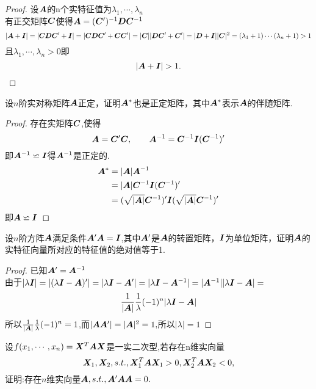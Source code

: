 \documentclass[lang=cn,11pt,normal]{elegantbook}
\begin{document}
	\begin{proof}
		设$\AA$的n个实特征值为$\lambda_1,\cdots,\lambda_n$
		\\有正交矩阵$\CC$使得$\AA=(\CC')^{-1}\DD\CC^{-1}$
		\begin{equation}
		|\AA+\II|=|\CC\DD\CC'+\II|=|\CC\DD\CC'+\CC\CC'|=|\CC||\DD\CC'+\CC'|=|\DD+\II||\CC|^2=(\lambda_1+1)\cdots(\lambda_n+1)>1
		\end{equation}
		且$\lambda_1,\cdots,\lambda_n>0$即
		\begin{equation}
		|\AA+\II|>1.
		\end{equation}
	\end{proof}
	\begin{exercise}
		设$n$阶实对称矩阵$\AA$正定，证明$\AA^*$也是正定矩阵，其中$\AA^*$表示$\AA$的伴随矩阵.
	\end{exercise}
	\begin{proof}
		存在实矩阵$\CC$,使得
		\begin{equation}\AA=\CC'\CC,\qquad\AA^{-1}=\CC^{-1}\II(\CC^{-1})'
		\end{equation}
		即$\AA^{-1}\backsimeq\II$得$\AA^{-1}$是正定的.\\
		\begin{equation}
		\begin{aligned}
		\AA^*&=|\AA|\AA^{-1}\\
		&=|\AA|\CC^{-1}\II(\CC^{-1})'\\
		&=(\sqrt{|\AA|}\CC^{-1})'\II(\sqrt{|\AA|}\CC^{-1})'
		\end{aligned}
		\end{equation}
		即$\AA\backsimeq\II$
	\end{proof}
	\begin{exercise}
		设$n$阶方阵$\AA$满足条件$\AA'\AA=\II$,其中$\AA'$是$\AA$的转置矩阵，$\II$为单位矩阵，证明$\AA$的实特征向量所对应的特征值的绝对值等于1.
	\end{exercise}
	\begin{proof}
		已知$\AA'=\AA^{-1}$\\
		由于$|\lambda\II|=|(\lambda\II-\AA)'|=|\lambda\II-\AA'|=|\lambda\II-\AA^{-1}|=|\AA^{-1}||\lambda\II-\AA|=$
		\begin{equation}
		\frac{1}{|\AA|}\frac{1}{\lambda}(-1)^n|\lambda\II-\AA|
		\end{equation}
		所以$\frac{1}{|\AA|}\frac{1}{\lambda}(-1)^n=1$,而$|\AA\AA'|=|\AA|^2=1,$所以$|\lambda|=1$
	\end{proof}
	\begin{exercise}
		设$f(x_1,\cdots,x_n)=\XX^T\AA\XX$是一实二次型,若存在n维实向量
		\begin{equation}
		\XX_1,\XX_2,s.t.,\XX_1^T\AA\XX_1>0,\XX_2^T\AA\XX_2<0,
		\end{equation}
		证明:存在$n$维实向量$\AA,s.t.,\AA'\AA\AA=0.$
	\end{exercise}
\end{document}
